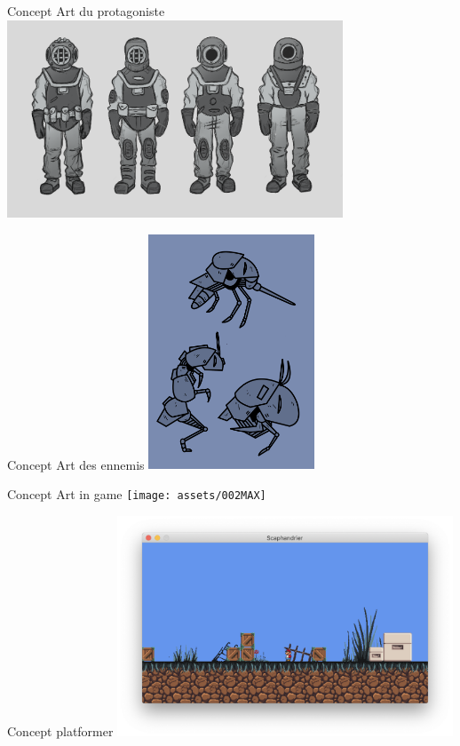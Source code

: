 \documentclass{beamer}
\begin{document}
\begin{frame}{Concept Art du protagoniste}
    \centering
    \includegraphics[width=10cm]{assets/CONCEPT_PROTAGONISTE}
\end{frame}

\begin{frame}{Concept Art des ennemis}
    \centering
    \includegraphics[height=7cm]{assets/02}
\end{frame}

\begin{frame}{Concept Art in game}
    \centering
    \texttt{[image: assets/002MAX]}
\end{frame}

\begin{frame}{Concept platformer}
    \centering
    \includegraphics[width=10cm]{assets/unknown}
\end{frame}
\end{document}
